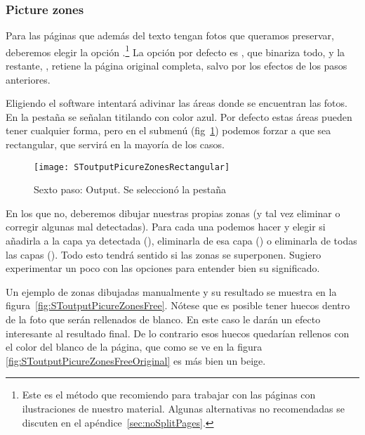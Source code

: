 \documentclass[%
	a5paper,
	10pt,
	twoside,
	openright,
	final,
]{memoir}
\begin{document}
	\subsubsection{Picture zones\label{sec:SToutputPictureZones}}

	Para las páginas que además del texto tengan fotos que queramos preservar, deberemos elegir la opción .\footnote{Este es el método que recomiendo para trabajar con las páginas con ilustraciones de nuestro material. Algunas alternativas no recomendadas se discuten en el apéndice~\ref{sec:noSplitPages}.} La opción por defecto es , que binariza todo, y la restante, , retiene la página original completa, salvo por los efectos de los pasos anteriores.

	Eligiendo  el software intentará adivinar las áreas donde se encuentran las fotos. En la pestaña  se señalan titilando con color azul. Por defecto estas áreas pueden tener cualquier forma, pero en el submenú  (fig~\ref{fig:SToutputPicureZonesRectangular}) podemos forzar a que sea rectangular, que servirá en la mayoría de los casos.

	\begin{figure}
		\centering
		\texttt{[image: SToutputPicureZonesRectangular]}
		\caption[Sexto paso: Output. Se seleccionó la pestaña Picture zones]{Sexto paso: Output. Se seleccionó la pestaña \label{fig:SToutputPicureZonesRectangular}}
	\end{figure}

	En los que no, deberemos dibujar nuestras propias zonas (y tal vez eliminar o corregir algunas mal detectadas). Para cada una podemos hacer  y elegir si añadirla a la capa ya detectada (), eliminarla de esa capa () o eliminarla de todas las capas (). Todo esto tendrá sentido si las zonas se superponen. Sugiero experimentar un poco con las opciones para entender bien su significado.

	Un ejemplo de zonas dibujadas manualmente y su resultado se muestra en la figura~\ref{fig:SToutputPicureZonesFree}. Nótese que es posible tener huecos dentro de la foto que serán rellenados de blanco. En este caso le darán un efecto interesante al resultado final. De lo contrario esos huecos quedarían rellenos con el color del blanco de la página, que como se ve en la figura \ref{fig:SToutputPicureZonesFreeOriginal} es más bien un beige.
\end{document}
